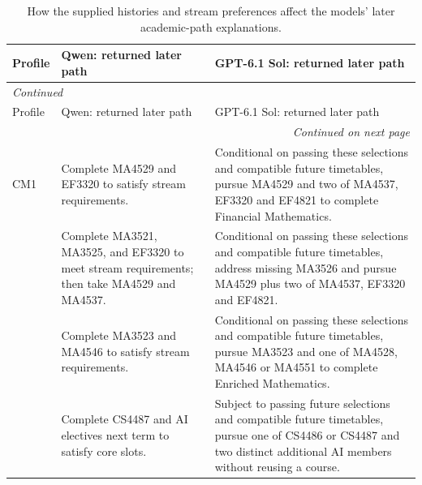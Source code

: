 \documentclass{article}
\begin{document}
{\small
\setlength{\tabcolsep}{4pt}
\renewcommand{\arraystretch}{1.12}
\begin{longtable}{p{0.45in}p{2.35in}p{2.35in}}
\caption{How the supplied histories and stream preferences affect the models' later academic-path explanations.}\label{tab:retest-path07}\\
\toprule
Profile & Qwen: returned later path & GPT-6.1 Sol: returned later path\\
\midrule
\endfirsthead
\multicolumn{3}{l}{\textit{Continued}}\\
\toprule
Profile & Qwen: returned later path & GPT-6.1 Sol: returned later path\\
\midrule
\endhead
\midrule
\multicolumn{3}{r}{\textit{Continued on next page}}\\
\endfoot
\bottomrule
\endlastfoot
{\raggedright CM1\par} & {\raggedright Complete MA4529 and EF3320 to satisfy stream requirements.\par} & {\raggedright Conditional on passing these selections and compatible future timetables, pursue MA4529 and two of MA4537, EF3320 and EF4821 to complete Financial Mathematics.\par}\\
\addlinespace[4pt]
{\raggedright CM2\par} & {\raggedright Complete MA3521, MA3525, and EF3320 to meet stream requirements; then take MA4529 and MA4537.\par} & {\raggedright Conditional on passing these selections and compatible future timetables, address missing MA3526 and pursue MA4529 plus two of MA4537, EF3320 and EF4821.\par}\\
\addlinespace[4pt]
{\raggedright CM3\par} & {\raggedright Complete MA3523 and MA4546 to satisfy stream requirements.\par} & {\raggedright Conditional on passing these selections and compatible future timetables, pursue MA3523 and one of MA4528, MA4546 or MA4551 to complete Enriched Mathematics.\par}\\
\addlinespace[4pt]
{\raggedright CS1\par} & {\raggedright Complete CS4487 and AI electives next term to satisfy core slots.\par} & {\raggedright Subject to passing future selections and compatible future timetables, pursue one of CS4486 or CS4487 and two distinct additional AI members without reusing a course.\par}\\

\end{longtable}}
\end{document}
